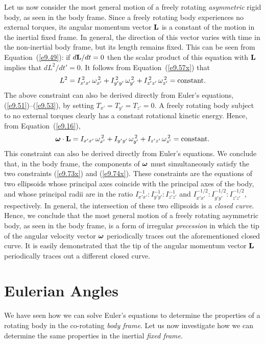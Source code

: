 Let us now consider the most general motion of a freely rotating
{\em asymmetric}\/ rigid body, as seen in the body frame. Since a freely rotating
body experiences no external torques, its angular momentum vector
${\bf L}$ is a constant of the motion in the inertial fixed frame. In general, the direction of this vector varies with time in the non-inertial body frame, but its
length remains fixed. This can be seen from Equation~(\ref{e9.49}):
if $d{\bf L}/dt=0$ then the scalar product of this equation
with ${\bf L}$ implies that $d L^2/dt'=0$. It follows from Equation~(\ref{e9.57x}) that
\begin{equation}\label{e9.73x}
L^2 = I_{x'x'}^{\,2}\,\omega_{x'}^{\,2} + I_{y'y'}^{\,2}\,\omega_{y'}^{\,2} 
+ I_{z'z'}^{\,2}\,\omega_{z'}^{\,2} ={\rm constant}.
\end{equation}
The above constraint can also be derived directly from Euler's equations,
(\ref{e9.51})--(\ref{e9.53}), by setting $T_{x'}=T_{y'}=T_{z'}=0$.
A freely rotating body subject to no external torques clearly has a constant rotational kinetic energy.
Hence, from Equation~(\ref{e9.16}), 
\begin{equation}\label{e9.74x}
\mbox{\boldmath$\omega$}\cdot {\bf L} =  I_{x'x'}\,\omega_{x'}^{\,2} + I_{y'y'}\,\omega_{y'}^{\,2} 
+ I_{z'z'}\,\omega_{z'}^{\,2} ={\rm constant}.
\end{equation}
This constraint can also be derived directly from Euler's equations.
We conclude that, in the body frame, the components of $\mbox{\boldmath$\omega$}$ must
simultaneously satisfy the two constraints (\ref{e9.73x}) and (\ref{e9.74x}).
These constraints are the equations of two ellipsoids whose principal 
axes coincide with the principal axes of the body, and whose principal
radii are in the ratio $I_{x'x'}^{-1}:I_{y'y'}^{-1}:I_{z'z'}^{-1}$
and $I_{x'x'}^{-1/2}:I_{y'y'}^{-1/2}:I_{z'z'}^{-1/2}$, respectively. 
In general, the intersection of these two ellipsoids is a {\em closed curve}. 
Hence, we conclude that the most general motion of a freely rotating
asymmetric body, as seen in the body frame, is a form of irregular
{\em precession}\/ in which the tip of the angular
velocity vector $\mbox{\boldmath$\omega$}$   periodically traces out the aforementioned closed curve. It is easily demonstrated that the tip of the angular momentum vector ${\bf L}$
periodically traces out a different closed curve.

\section{Eulerian Angles}\label{seuler}
We have seen how we can solve Euler's equations to determine the properties
of a rotating body in the co-rotating {\em body frame}. Let us now investigate how we can determine the same properties in the inertial
{\em fixed frame}.

